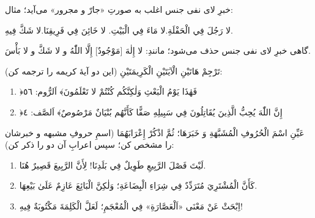 \begin{JGood}
خبرِ لای نفی جنس اغلب به صورتِ «جارّ و مجرور» می‌آید؛ مثال:

\Ar لا رَجُلَ فِي الْحَفْلَةِ.\quad لا مَاءَ فِي الْبَيْتِ.\quad
لا خَائِنَ فِي فَرِيقِنَا.\quad لا شَكَّ فِيهِ.
\end{JGood}

\begin{JNokte}
گاهی خبرِ لای نفی جنس حذف می‌شود؛ مانندِ: لا إِلٰهَ [مَوْجُودٌ] إِلَّا اللّٰهُ
و لا شَكَّ و لا بَأْسَ.
\end{JNokte}


\begin{JTest}
تَرْجِمْ هَاتَيْنِ الْآيَتَيْنِ الْكَرِيمَتَيْنِ (این دو آیهٔ کریمه را ترجمه کن):

\begin{enumerate}
  \item ﴿فَهٰذَا يَوْمُ الْبَعْثِ وَلٰكِنَّكُم كُنْتُمْ لا تَعْلَمُونَ﴾
        اَلرُّوم: ٥٦
  \item ﴿إِنَّ اللّٰهَ يُحِبُّ الَّذِينَ يُقَاتِلُونَ فِي سَبِيلِهِ صَفًّا
        كَأَنَّهُم بُنْيَانٌ مَرْصُوصٌ﴾ اَلصَّف: ٤
         
\end{enumerate}
\end{JTest}

\begin{JTest}
عَيِّنِ اسْمَ الْحُرُوفِ الْمُشَبَّهَةِ وَ خَبَرَهَا؛ ثُمَّ اذْكُرْ إِعْرَابَهُمَا
(اسمِ حروفِ مشبهه و خبرشان را مشخص کن؛ سپس اعرابِ آن دو را ذکر کن):

\begin{enumerate}
  \item لَيْتَ فَصْلَ الرَّبِيعِ طَوِيلٌ فِي بَلَدِنَا! لِأَنَّ الرَّبِيعَ
        قَصِيرٌ هُنَا.
  \item كَأَنَّ الْمُشْتَرِيَ مُتَرَدِّدٌ فِي شِرَاءِ الْبِضَاعَةِ؛ وَلٰكِنَّ
        الْبَائِعَ عَازِمٌ عَلَىٰ بَيْعِهَا.
  \item اِبْحَثْ عَنْ مَعْنَى «اَلْعَصَّارَةِ» فِي الْمُعْجَمِ؛ لَعَلَّ
        الْكَلِمَةَ مَكْتُوبَةٌ فِيهِ!
\end{enumerate}
\end{JTest}

